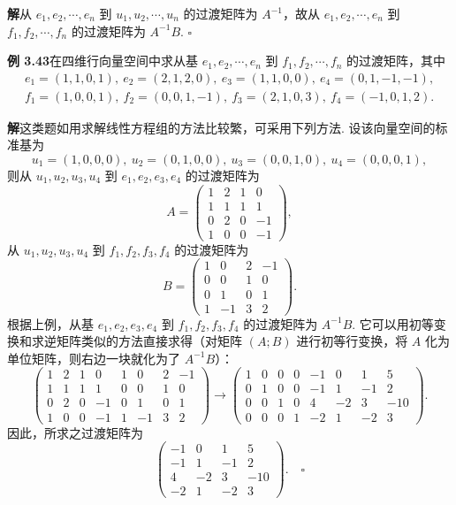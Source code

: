 \documentclass[UTF8,12pt,a4paper,fontset=fandol]{ctexart}
\begin{document}
\noindent\textbf{解}\quad 从 $e_1,e_2,\cdots,e_n$ 到 $u_1,u_2,\cdots,u_n$ 的过渡矩阵为 $A^{-1}$，故从 $e_1,e_2,\cdots,e_n$ 到 $f_1,f_2,\cdots,f_n$ 的过渡矩阵为 $A^{-1}B$. $\square$

\noindent\textbf{例 3.43}\quad 在四维行向量空间中求从基 $e_1,e_2,\cdots,e_n$ 到 $f_1,f_2,\cdots,f_n$ 的过渡矩阵，其中
\[
\begin{gathered}
e_1=(1,1,0,1),\ e_2=(2,1,2,0),\ e_3=(1,1,0,0),\ e_4=(0,1,-1,-1),\\
f_1=(1,0,0,1),\ f_2=(0,0,1,-1),\ f_3=(2,1,0,3),\ f_4=(-1,0,1,2).
\end{gathered}
\]

\noindent\textbf{解}\quad 这类题如用求解线性方程组的方法比较繁，可采用下列方法. 设该向量空间的标准基为
\[
u_1=(1,0,0,0),\ u_2=(0,1,0,0),\ u_3=(0,0,1,0),\ u_4=(0,0,0,1),
\]
则从 $u_1,u_2,u_3,u_4$ 到 $e_1,e_2,e_3,e_4$ 的过渡矩阵为
\[
A=\begin{pmatrix}
1 & 2 & 1 & 0\\
1 & 1 & 1 & 1\\
0 & 2 & 0 & -1\\
1 & 0 & 0 & -1
\end{pmatrix},
\]
从 $u_1,u_2,u_3,u_4$ 到 $f_1,f_2,f_3,f_4$ 的过渡矩阵为
\[
B=\begin{pmatrix}
1 & 0 & 2 & -1\\
0 & 0 & 1 & 0\\
0 & 1 & 0 & 1\\
1 & -1 & 3 & 2
\end{pmatrix}.
\]
根据上例，从基 $e_1,e_2,e_3,e_4$ 到 $f_1,f_2,f_3,f_4$ 的过渡矩阵为 $A^{-1}B$. 它可以用初等变换和求逆矩阵类似的方法直接求得（对矩阵 $(A;B)$ 进行初等行变换，将 $A$ 化为单位矩阵，则右边一块就化为了 $A^{-1}B$）：
\[
\left(\begin{array}{cccc|cccc}
1&2&1&0&1&0&2&-1\\
1&1&1&1&0&0&1&0\\
0&2&0&-1&0&1&0&1\\
1&0&0&-1&1&-1&3&2
\end{array}\right)
\to
\left(\begin{array}{cccc|cccc}
1&0&0&0&-1&0&1&5\\
0&1&0&0&-1&1&-1&2\\
0&0&1&0&4&-2&3&-10\\
0&0&0&1&-2&1&-2&3
\end{array}\right).
\]
因此，所求之过渡矩阵为
\[
\begin{pmatrix}
-1 & 0 & 1 & 5\\
-1 & 1 & -1 & 2\\
4 & -2 & 3 & -10\\
-2 & 1 & -2 & 3
\end{pmatrix}. \quad \square
\]
\end{document}
